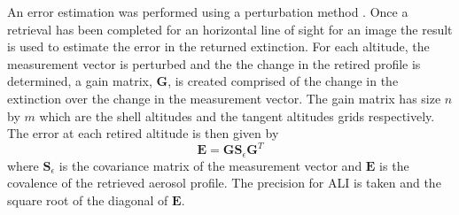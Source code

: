 \documentclass[12pt]{article}
\begin{document}
An error estimation was performed using a perturbation method \citep{Bourassa2012b}. Once a retrieval has been completed for an horizontal line of sight for an image the result is used to estimate the error in the returned extinction. For each altitude, the measurement vector is perturbed and the the change in the retired profile is determined, a gain matrix, $\mathbf{G}$, is created comprised of the change in the extinction over the change in the measurement vector. The gain matrix has size $n$ by $m$ which are the shell altitudes and the tangent altitudes grids respectively. The error at each retired altitude is then given by
\begin{equation}
    \mathbf{E} = \mathbf{G}\mathbf{S}_{\epsilon}\mathbf{G}^{T}
\end{equation}
where $\mathbf{S}_{\epsilon}$ is the covariance matrix of the measurement vector and $\mathbf{E}$ is the covalence of the retrieved aerosol profile. The precision for ALI is taken and the square root of the diagonal of $\mathbf{E}$.
\end{document}
